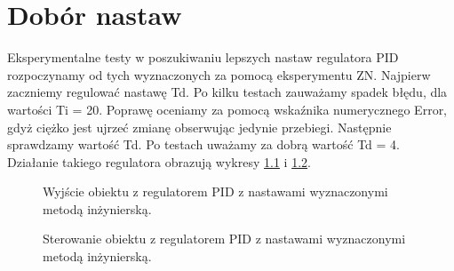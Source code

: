 \chapter{Dobór nastaw}
Eksperymentalne testy w poszukiwaniu lepszych nastaw regulatora PID rozpoczynamy od tych wyznaczonych za pomocą eksperymentu ZN.
Najpierw zaczniemy regulować nastawę Td. Po kilku testach zauważamy spadek błędu, dla wartości Ti = 20. Poprawę oceniamy za pomocą wskaźnika numerycznego Error,
gdyż ciężko jest ujrzeć zmianę obserwując jedynie przebiegi. Następnie sprawdzamy wartość Td. Po testach uważamy za dobrą wartość Td = 4. Działanie takiego regulatora
obrazują wykresy \ref{fig:inz_pid_out} i \ref{fig:inz_pid_ster}.

\begin{figure}[tb]
\centering
{}
\caption{Wyjście obiektu z regulatorem PID z nastawami wyznaczonymi metodą inżynierską.}
\label{fig:inz_pid_out}
\end{figure}

\begin{figure}[tb]
\centering
{}
\caption{Sterowanie obiektu z regulatorem PID z nastawami wyznaczonymi metodą inżynierską.}
\label{fig:inz_pid_ster}
\end{figure}
